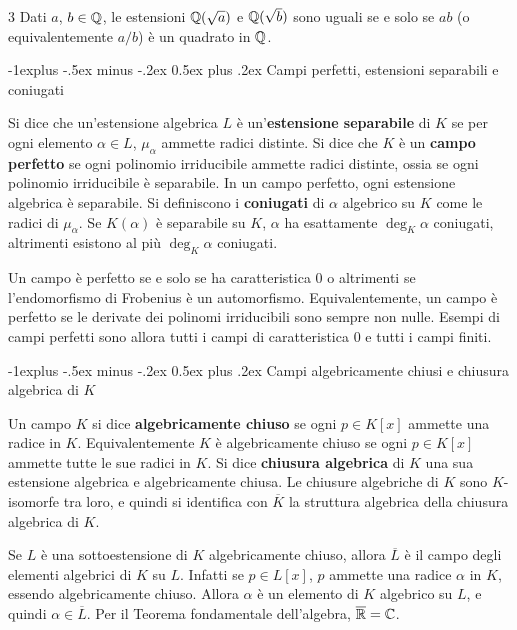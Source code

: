 \documentclass[10pt,landscape]{article}
\makeatletter
\renewcommand{\subsection}{\@startsection{subsection}{2}{0mm}%
	{-1explus -.5ex minus -.2ex}%
	{0.5ex plus .2ex}%
	{\normalfont\normalsize\bfseries}}
\makeatother
\begin{document}
\begin{multicols}{3}
	Dati $a$, $b \in \mathbb Q$, le estensioni $\mathbb Q(\sqrt{a})$ e
	$\mathbb Q(\sqrt{b})$ sono uguali se e solo se $ab$ (o equivalentemente
	$a/b$) è un quadrato in $\mathbb Q$.

	\subsection{Campi perfetti, estensioni separabili e coniugati}

	Si dice che un'estensione algebrica $L$ è un'\textbf{estensione separabile} di
	$K$ se per ogni elemento $\alpha \in L$,
	$\mu_\alpha$ ammette radici distinte. Si dice
	che $K$ è un \textbf{campo perfetto} se ogni
	polinomio irriducibile ammette radici distinte,
	ossia se ogni polinomio irriducibile è separabile.
	In un campo perfetto, ogni estensione algebrica
	è separabile. Si definiscono i \textbf{coniugati} di
	$\alpha$ algebrico su $K$ come le radici
	di $\mu_\alpha$. Se $K(\alpha)$ è separabile su $K$,
	$\alpha$ ha esattamente $\deg_K \alpha$ coniugati,
	altrimenti esistono al più $\deg_K \alpha$ coniugati. \smallskip

	Un campo è perfetto se e solo se ha caratteristica
	$0$ o altrimenti se l'endomorfismo di
	Frobenius è un automorfismo. Equivalentemente,
	un campo è perfetto se le derivate dei polinomi
	irriducibili sono sempre non nulle. Esempi di
	campi perfetti sono allora tutti i campi di
	caratteristica $0$ e tutti i campi finiti.

	\subsection{Campi algebricamente chiusi e chiusura algebrica di \texorpdfstring{$K$}{K}}

	Un campo $K$ si dice \textbf{algebricamente chiuso} se
	ogni $p \in K[x]$ ammette una radice in $K$. Equivalentemente $K$ è algebricamente chiuso se
	ogni $p \in K[x]$ ammette tutte le sue radici in $K$.
	Si dice \textbf{chiusura algebrica} di $K$
	una sua estensione algebrica e algebricamente
	chiusa. Le chiusure algebriche di $K$ sono
	$K$-isomorfe tra loro, e quindi si identifica
	con $\overline{K}$ la struttura algebrica della
	chiusura algebrica di $K$. \smallskip

	Se $L$ è una sottoestensione di $K$ algebricamente
	chiuso, allora $\overline{L}$ è il campo degli
	elementi algebrici di $K$ su $L$. Infatti se
	$p \in L[x]$, $p$ ammette una radice $\alpha$ in $K$, essendo
	algebricamente chiuso. Allora $\alpha$ è un elemento
	di $K$ algebrico su $L$, e quindi $\alpha \in \overline{L}$. Per il Teorema fondamentale dell'algebra,
	$\overline{\mathbb R} = \mathbb C$.


\end{multicols}
\end{document}
